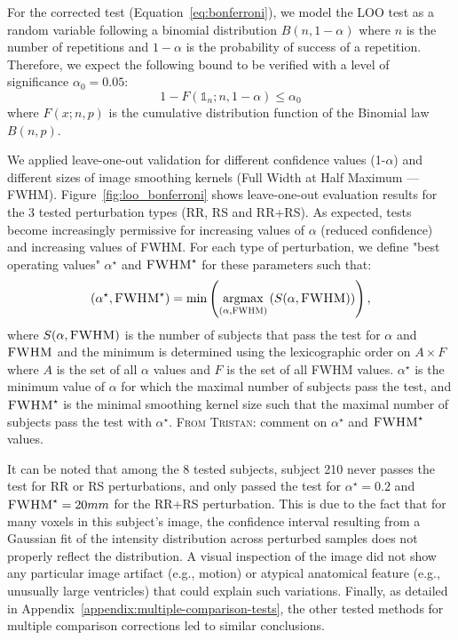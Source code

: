\documentclass{article}
\newcommand{\TG}[1]{\color{blue}\textsc{From Tristan:} #1\color{black}\xspace}
\newcommand{\fwhm}{\textsc{FWHM}}
\begin{document}



For the corrected test
(Equation~\ref{eq:bonferroni}), we model the LOO test
as a random variable following a binomial distribution $B(n,1-\alpha)$
where $n$ is the number of repetitions and $1-\alpha$ is
the probability of success of a repetition. Therefore, we expect the following
bound to be verified with a level of significance
$\alpha_0=0.05$:
\[
    1 - F(\mathds{1}_n;n,1-\alpha) \leq \alpha_0
\]
where $F(x;n,p)$ is the cumulative distribution function of the Binomial law $B(n,p)$.

We applied leave-one-out validation for
different  confidence values (1-$\alpha$) and different sizes of image smoothing
kernels (Full Width at Half Maximum --- FWHM).
Figure~\ref{fig:loo_bonferroni} shows leave-one-out evaluation results
for the 3 tested perturbation types (RR, RS and RR+RS). As expected, tests
become increasingly permissive for increasing values of $\alpha$ (reduced
confidence) and increasing values of FWHM. For each type of perturbation, we
define "best operating values" $\alpha^\star$ and $\fwhm^\star$ for these parameters
such that:
\begin{equation}
    (\alpha^\star, \fwhm^\star) = \min\left(\underset{(\alpha, \fwhm)}{\mathrm{argmax}}\left( S(\alpha,\fwhm)\right)\right),
\end{equation}
where $S(\alpha, \fwhm)$ is the number of subjects that pass the test for
$\alpha$ and $\fwhm$ and the minimum is determined using the lexicographic
order on $A \times F$ where $A$ is the set of all $\alpha$ values and $F$ is the
set of all FWHM values. $\alpha^\star$ is the minimum value of $\alpha$ for which
the maximal number of subjects pass the test, and $\fwhm^\star$ is the minimal
smoothing kernel size such that the maximal number of subjects pass the test
with $\alpha^\star$. \TG{comment on $\alpha^\star$ and $\fwhm^\star$ values.}


It can be
noted that among the 8 tested subjects, subject 210 never passes the test for RR
or RS perturbations, and only passed the test for $\alpha^\star=0.2$ and
$\fwhm^\star=20mm$ for the RR+RS perturbation. This is due to the fact that for
many voxels in this subject's image, the confidence interval resulting from a
Gaussian fit of the intensity distribution across perturbed samples does not
properly reflect the distribution. A visual inspection of the image did not
show any particular image artifact (e.g., motion) or atypical anatomical feature
(e.g., unusually large ventricles) that could explain such variations. Finally,
as detailed in Appendix~\ref{appendix:multiple-comparison-tests}, the other
tested methods for multiple comparison corrections led to similar conclusions.
\end{document}
